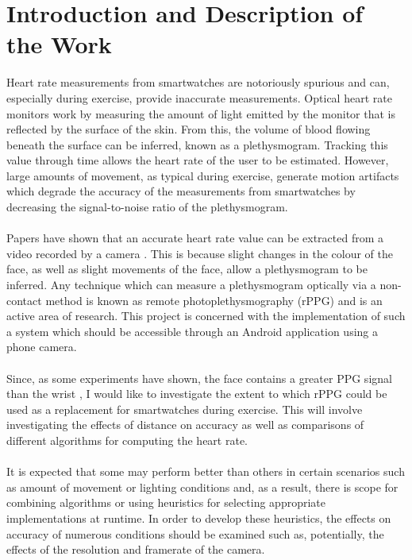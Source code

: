\section*{Introduction and Description of the Work}
Heart rate measurements from smartwatches are notoriously spurious and can, especially during exercise, provide inaccurate measurements. Optical heart rate monitors work by measuring the amount of light emitted by the monitor that is reflected by the surface of the skin. From this, the volume of blood flowing beneath the surface can be inferred, known as a plethysmogram. Tracking this value through time allows the heart rate of the user to be estimated. However, large amounts of movement, as typical during exercise, generate motion artifacts which degrade the accuracy of the measurements from smartwatches by decreasing the signal-to-noise ratio of the plethysmogram. \\ \\
Papers have shown that an accurate heart rate value can be extracted from a video recorded by a camera \cite{originalPaper}. This is because slight changes in the colour of the face, as well as slight movements of the face, allow a plethysmogram to be inferred. Any technique which can measure a plethysmogram optically via a non-contact method is known as remote photoplethysmography (rPPG) and is an active area of research. This project is concerned with the implementation of such a system which should be accessible through an Android application using a phone camera. \\ \\
Since, as some experiments have shown, the face contains a greater PPG signal than the wrist \cite{vanderKooij2019}, I would like to investigate the extent to which rPPG could be used as a replacement for smartwatches during exercise. This will involve investigating the effects of distance on accuracy as well as comparisons of different algorithms for computing the heart rate. \\ \\
It is expected that some may perform better than others in certain scenarios such as amount of movement or lighting conditions and, as a result, there is scope for combining algorithms or using heuristics for selecting appropriate implementations at runtime. In order to develop these heuristics, the effects on accuracy of numerous conditions should be examined such as, potentially, the effects of the resolution and framerate of the camera. \\ \\
